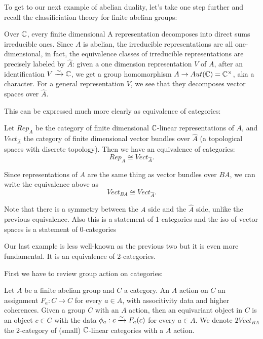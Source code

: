 \documentclass[./main]{subfiles}
\begin{document}
To get to our next example of abelian duality, let's take one step further and 
recall the classificiation theory for finite abelian groups:

Over $\mathbb{C}$, every finite dimensional A representation decomposes into direct sums 
irreducible ones. Since $A$ is abelian, the irreducible representations are all one-dimensional,
in fact, the equivalence classes of irreducible representations are precisely labeled by $\hat{A}$:
given a one dimension representation $V$ of $A$, after an identification $V \xrightarrow{\sim} \mathbb{C}$,
we get a group homomorphism $A \rightarrow Aut(\mathbb{C}) = \mathbb{C}^\times$, aka a character.
For a general representation $V$, we see that they decomposes vector spaces over $\hat{A}$.


This can be expressed much more clearly as equivalence of categories:
\begin{theorem}
    Let $Rep_A$ be the category of finite dimensional $\mathbb{C}$-linear representations of $A$, 
    and $Vect_{\hat{A}}$ the category of finite dimensional vector bundles over $\hat{A}$ (a topological spaces with discrete topology).
    Then we have an equivalence of categories:
    \begin{equation}
        Rep_A \cong Vect_{\hat{A}}.
    \end{equation}
\end{theorem}

Since representations of $A$ are the same thing as vector bundles over $BA$, we can write the 
equivalence above as 
\begin{equation}
    Vect_{BA} \cong Vect_{\hat{A}}.
\end{equation}
\begin{remark}
Note that there is a symmetry between the $A$ side and the $\hat{A}$ side, unlike the 
previous equivalence. Also this is a statement of 1-categories and the iso of 
vector spaces is a statement of 0-categories
\end{remark}

Our last example is less well-known as the previous two but it is even more fundamental.
It is an equivalence of 2-categories. 

First we have to review group action on categories:
\begin{definition}
    Let $A$ be a finite abelian group and $C$ a category. An $A$ action on $C$ an assignment
    $F_a : C \rightarrow C$ for every $a \in A$, with associtivity data and higher coherences.
    Given a group $C$ with an $A$ action, then an equivariant object in $C$ is an object $c \in C$
    with the data $\phi_a: c \xrightarrow{\sim} F_a(c)$ for every $a \in A$. 
    We denote $2Vect_{BA}$ the 2-category of 
    (small) $\mathbb{C}$-linear categories with a $A$ action.
\end{definition}
\end{document}
